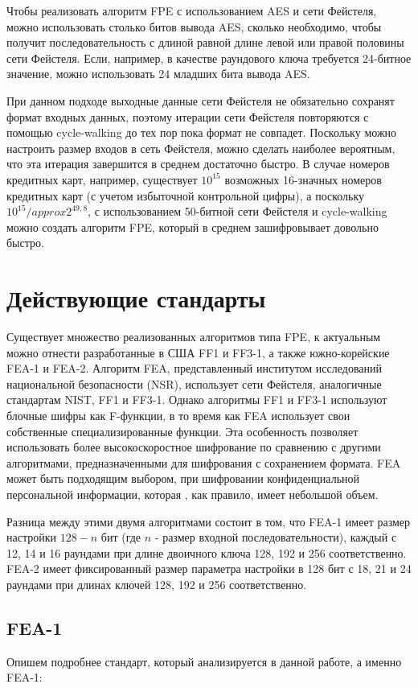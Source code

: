 \documentclass[utf8x, 14pt]{G7-32} %
\begin{document}
Чтобы реализовать алгоритм FPE с использованием AES и сети Фейстеля, можно использовать столько битов вывода AES, сколько необходимо, чтобы получит последовательность с длиной равной длине левой или правой половины сети Фейстеля. Если, например, в качестве раундового ключа требуется 24-битное значение, можно использовать 24 младших бита вывода AES.


При данном подходе выходные данные сети Фейстеля не обязательно сохранят формат входных данных, поэтому итерации сети Фейстеля повторяются с помощью cycle-walking до тех пор пока формат не совпадет. Поскольку можно настроить размер входов в сеть Фейстеля, можно сделать наиболее вероятным, что эта итерация завершится в среднем достаточно быстро. В случае номеров кредитных карт, например, существует $10^{15}$ возможных 16-значных номеров кредитных карт (с учетом избыточной контрольной цифры), а поскольку $10^{15} /approx 2^{49,8}$, с использованием 50-битной сети Фейстеля и cycle-walking можно создать алгоритм FPE, который в среднем зашифровывает довольно быстро.

\section{Действующие стандарты} %
Существует множество реализованных алгоритмов типа FPE, к актуальным можно отнести разработанные в США FF1 и FF3-1, а также южно-корейские FEA-1 и FEA-2.
Алгоритм FEA, представленный институтом исследований национальной безопасности (NSR), использует сети Фейстеля, аналогичные стандартам NIST, FF1 и FF3-1. Однако алгоритмы FF1 и FF3-1 используют блочные шифры как F-функции, в то время как FEA использует свои собственные специализированные функции. Эта особенность позволяет использовать более высокоскоростное шифрование по сравнению с другими алгоритмами, предназначенными для шифрования с сохранением формата. FEA может быть подходящим выбором, при шифровании конфиденциальной персональной информации, которая , как правило, имеет небольшой объем.


Разница между этими двумя алгоритмами состоит в том, что FEA-1 имеет размер настройки $128-n$ бит (где $n$ - размер входной последовательности), каждый с 12, 14 и 16 раундами при длине двоичного ключа 128, 192 и 256 соответственно. FEA-2 имеет фиксированный размер параметра настройки в 128 бит с 18, 21 и 24 раундами при длинах ключей 128, 192 и 256 соответственно.

\subsection{FEA-1}
Опишем подробнее стандарт, который анализируется в данной работе, а именно FEA-1:
\end{document}
